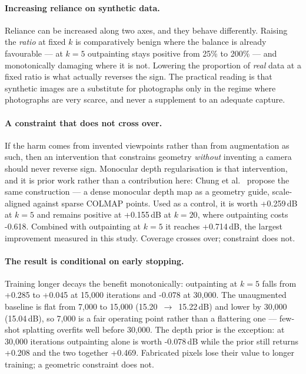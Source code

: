 \documentclass{article}
\begin{document}
\paragraph{Increasing reliance on synthetic data.} Reliance can be increased
along two axes, and they behave differently. Raising the \emph{ratio} at fixed
$k$ is comparatively benign where the balance is already favourable --- at
$k = 5$ outpainting stays positive from 25\% to 200\% --- and monotonically
damaging where it is not. Lowering the proportion of \emph{real} data at a
fixed ratio is what actually reverses the sign. The practical reading is that
synthetic images are a substitute for photographs only in the regime where
photographs are very scarce, and never a supplement to an adequate capture.

\paragraph{A constraint that does not cross over.} If the harm comes from
invented viewpoints rather than from augmentation as such, then an intervention
that constrains geometry \emph{without} inventing a camera should never
reverse sign. Monocular depth regularisation is that intervention, and it is
prior work rather than a contribution here: Chung et al.~\cite{chung2023depthreg}
propose the same construction --- a dense monocular depth map as a geometry
guide, scale-aligned against sparse COLMAP points. Used as a control, it is
worth +0.259\,dB at $k = 5$ and remains positive at +0.155\,dB at $k = 20$,
where outpainting costs -0.618. Combined with outpainting at $k = 5$ it
reaches +0.714\,dB, the largest improvement measured in this study. Coverage
crosses over; constraint does not.

\paragraph{The result is conditional on early stopping.} Training longer
decays the benefit monotonically: outpainting at $k = 5$ falls from +0.285 to
+0.045 at 15{,}000 iterations and -0.078 at 30{,}000. The unaugmented
baseline is flat from 7{,}000 to 15{,}000 (15.20~$\rightarrow$~15.22\,dB)
and lower by 30{,}000 (15.04\,dB), so 7{,}000 is a fair operating point
rather than a flattering one --- few-shot splatting overfits well before
30{,}000. The depth prior is the exception: at 30{,}000 iterations outpainting
alone is worth -0.078\,dB while the prior still returns +0.208 and the two
together +0.469. Fabricated pixels lose their value to longer training; a
geometric constraint does not.
\end{document}
